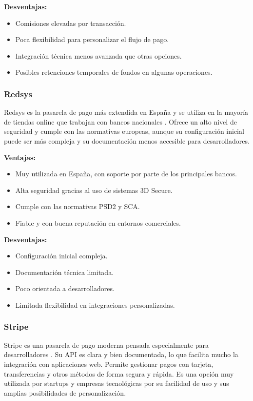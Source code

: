 \textbf{Desventajas:}
\begin{itemize}
    \item Comisiones elevadas por transacción.
    \item Poca flexibilidad para personalizar el flujo de pago.
    \item Integración técnica menos avanzada que otras opciones.
    \item Posibles retenciones temporales de fondos en algunas operaciones.
\end{itemize}


\subsubsection{Redsys}
Redsys es la pasarela de pago más extendida en España y se utiliza en la mayoría de tiendas online que trabajan con bancos nacionales \cite{redsysDocs}. Ofrece un alto nivel de seguridad y cumple con las normativas europeas, aunque su configuración inicial puede ser más compleja y su documentación menos accesible para desarrolladores.

\textbf{Ventajas:}
\begin{itemize}
    \item Muy utilizada en España, con soporte por parte de los principales bancos.
    \item Alta seguridad gracias al uso de sistemas 3D Secure.
    \item Cumple con las normativas PSD2 y SCA.
    \item Fiable y con buena reputación en entornos comerciales.
\end{itemize}

\textbf{Desventajas:}
\begin{itemize}
    \item Configuración inicial compleja.
    \item Documentación técnica limitada.
    \item Poco orientada a desarrolladores.
    \item Limitada flexibilidad en integraciones personalizadas.
\end{itemize}


\subsubsection{Stripe}
Stripe es una pasarela de pago moderna pensada especialmente para desarrolladores \cite{stripeDocs}. Su API es clara y bien documentada, lo que facilita mucho la integración con aplicaciones web. Permite gestionar pagos con tarjeta, transferencias y otros métodos de forma segura y rápida. Es una opción muy utilizada por startups y empresas tecnológicas por su facilidad de uso y sus amplias posibilidades de personalización.

